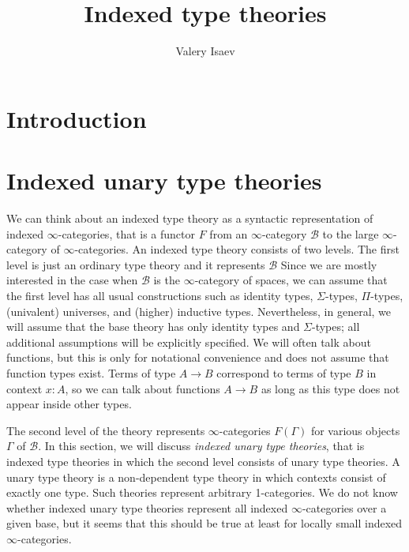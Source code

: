 \documentclass[reqno]{amsart}
\theoremstyle{definition}
\theoremstyle{remark}
\numberwithin{figure}{section}
\begin{document}
\title{Indexed type theories}

\author{Valery Isaev}

\begin{abstract}
\end{abstract}

\maketitle

\section{Introduction}

\section{Indexed unary type theories}

We can think about an indexed type theory as a syntactic representation of indexed $\infty$-categories, that is a functor $F$ from an $\infty$-category $\mathcal{B}$ to the large $\infty$-category of $\infty$-categories.
An indexed type theory consists of two levels.
The first level is just an ordinary type theory and it represents $\mathcal{B}$
Since we are mostly interested in the case when $\mathcal{B}$ is the $\infty$-category of spaces,
we can assume that the first level has all usual constructions such as identity types, $\Sigma$-types, $\Pi$-types, (univalent) universes, and (higher) inductive types.
Nevertheless, in general, we will assume that the base theory has only identity types and $\Sigma$-types; all additional assumptions will be explicitly specified.
We will often talk about functions, but this is only for notational convenience and does not assume that function types exist.
Terms of type $A \to B$ correspond to terms of type $B$ in context $x : A$, so we can talk about functions $A \to B$ as long as this type does not appear inside other types.

The second level of the theory represents $\infty$-categories $F(\Gamma)$ for various objects $\Gamma$ of $\mathcal{B}$.
In this section, we will discuss \emph{indexed unary type theories}, that is indexed type theories in which the second level consists of unary type theories.
A unary type theory is a non-dependent type theory in which contexts consist of exactly one type.
Such theories represent arbitrary 1-categories.
We do not know whether indexed unary type theories represent all indexed $\infty$-categories over a given base, but it seems that this should be true at least for locally small indexed $\infty$-categories.
\end{document}
